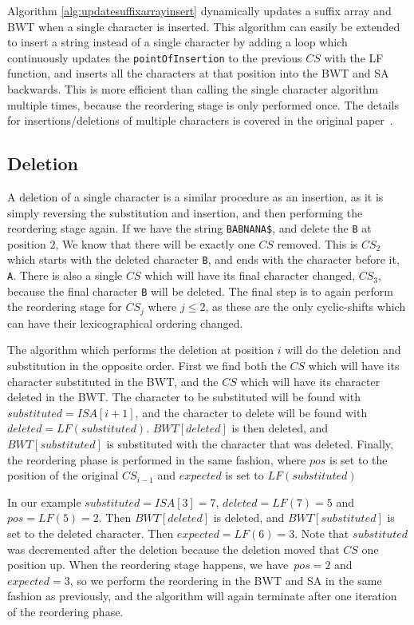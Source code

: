 Algorithm \ref{alg:updatesuffixarrayinsert} dynamically updates a suffix array and BWT
when a single character is inserted. This algorithm can easily be extended to insert a
string instead of a single character by adding a loop which continuously updates the
\verb|pointOfInsertion| to the previous $CS$ with the LF function, and inserts all the
characters at that position into the BWT and SA backwards. This is more efficient than
calling the single character algorithm multiple times, because the reordering stage is
only performed once. The details for insertions/deletions of multiple characters is
covered in the original paper~\cite{DynamicExtendedSuffixArrays}.

\subsection*{Deletion}

A deletion of a single character is a similar procedure as an insertion, as it is simply
reversing the substitution and insertion, and then performing the reordering stage again.
If we have the string \verb|BABNANA$|, and delete the \verb|B| at position $2$, We know
that there will be exactly one $CS$ removed. This is $CS_2$ which starts with the deleted
character \verb|B|, and ends with the character before it, \verb|A|. There is also a
single $CS$ which will have its final character changed, $CS_3$, because the final
character \verb|B| will be deleted. The final step is to again perform the reordering
stage for $CS_j$ where $j \leq 2$, as these are the only cyclic-shifts which can have
their lexicographical ordering changed.

The algorithm which performs the deletion at position $i$ will do the deletion and
substitution in the opposite order. First we find both the $CS$ which will have its
character substituted in the BWT, and the $CS$ which will have its character deleted in
the BWT. The character to be substituted will be found with $substituted = ISA[i + 1]$,
and the character to delete will be found with $deleted = LF(substituted)$. $BWT[deleted]$
is then deleted, and $BWT[substituted]$ is substituted with the character that was
deleted. Finally, the reordering phase is performed in the same fashion, where $pos$ is
set to the position of the original $CS_{i - 1}$ and $expected$ is set to $LF(substituted)$

In our example $substituted = ISA[3] = 7$, $deleted = LF(7) = 5$ and $pos = LF(5) = 2$.
Then $BWT[deleted]$ is deleted, and $BWT[substituted]$ is set to the deleted character.
Then $expected = LF(6) = 3$. Note that $substituted$ was decremented after the deletion
because the deletion moved that $CS$ one position up. When the reordering stage happens,
we have $pos = 2$ and $expected = 3$, so we perform the reordering in the BWT and SA in the
same fashion as previously, and the algorithm will again terminate after one iteration of
the reordering phase.

